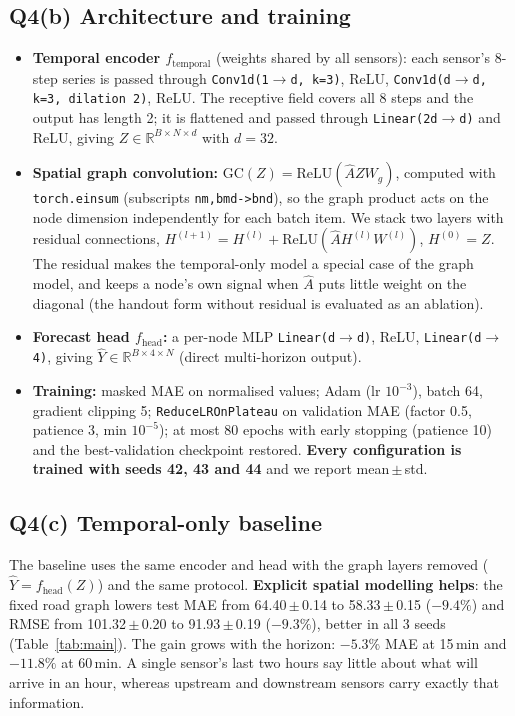 \documentclass[11pt,a4paper]{article}
\newcommand{\sd}[2]{#1{\scriptsize\,$\scriptstyle\pm$\,#2}}
\begin{document}
\subsection{Q4(b) Architecture and training}
\begin{itemize}
\item \textbf{Temporal encoder $f_{\text{temporal}}$} (weights shared by all sensors): each sensor's 8-step series is
passed through \texttt{Conv1d(1$\to$d, k=3)}, ReLU, \texttt{Conv1d(d$\to$d, k=3, dilation 2)}, ReLU. The receptive field
covers all 8 steps and the output has length 2; it is flattened and passed through \texttt{Linear(2d$\to$d)} and ReLU,
giving $Z\in\mathbb R^{B\times N\times d}$ with $d=32$.
\item \textbf{Spatial graph convolution:} $\mathrm{GC}(Z)=\mathrm{ReLU}(\hat A Z W_g)$, computed with
\texttt{torch.einsum} (subscripts \texttt{nm,bmd->bnd}), so the graph product acts on the node dimension
independently for each batch item. We stack two layers with residual connections,
$H^{(l+1)}=H^{(l)}+\mathrm{ReLU}(\hat A H^{(l)}W^{(l)})$, $H^{(0)}=Z$. The residual makes the temporal-only model a special
case of the graph model, and keeps a node's own signal when $\hat A$ puts little weight on the diagonal (the handout form
without residual is evaluated as an ablation).
\item \textbf{Forecast head $f_{\text{head}}$:} a per-node MLP \texttt{Linear(d$\to$d)}, ReLU, \texttt{Linear(d$\to$4)}, giving
$\hat Y\in\mathbb R^{B\times4\times N}$ (direct multi-horizon output).
\item \textbf{Training:} masked MAE on normalised values; Adam (lr $10^{-3}$), batch 64, gradient clipping 5;
\texttt{ReduceLROnPlateau} on validation MAE (factor 0.5, patience 3, min $10^{-5}$); at most 80 epochs with early stopping
(patience 10) and the best-validation checkpoint restored. \textbf{Every configuration is trained with seeds 42, 43 and 44}
and we report mean\,$\pm$\,std.
\end{itemize}

\subsection{Q4(c) Temporal-only baseline}
The baseline uses the same encoder and head with the graph layers removed ($\hat Y=f_{\text{head}}(Z)$) and the same
protocol. \textbf{Explicit spatial modelling helps}: the fixed road graph lowers test MAE from \sd{64.40}{0.14} to
\sd{58.33}{0.15} ($-9.4\%$) and RMSE from \sd{101.32}{0.20} to \sd{91.93}{0.19} ($-9.3\%$), better in all 3 seeds
(Table~\ref{tab:main}). The gain grows with the horizon: $-5.3\%$ MAE at 15\,min and $-11.8\%$ at 60\,min. A single sensor's
last two hours say little about what will arrive in an hour, whereas upstream and downstream sensors carry exactly that
information.
\end{document}
